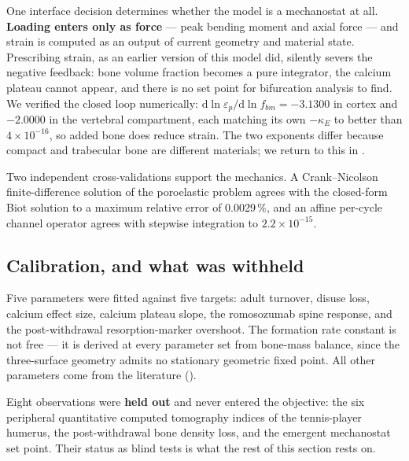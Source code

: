 \documentclass[10pt,letterpaper]{article}
\begin{document}
One interface decision determines whether the model is a mechanostat at all.
\textbf{Loading enters only as force} --- peak bending moment and axial force
--- and strain is computed as an output of current geometry and material
state. Prescribing strain, as an earlier version of this model did, silently
severs the negative feedback: bone volume fraction becomes a pure integrator,
the calcium plateau cannot appear, and there is no set point for bifurcation
analysis to find. We verified the closed loop numerically:
$\mathrm{d}\ln\varepsilon_p/\mathrm{d}\ln f_{bm} = -3.1300$ in cortex and
$-2.0000$ in the vertebral compartment, each matching its own $-\kappa_E$ to
better than $4\times10^{-16}$, so added bone does reduce strain. The two
exponents differ because compact and trabecular bone are different materials;
we return to this in .

Two independent cross-validations support the mechanics. A Crank--Nicolson
finite-difference solution of the poroelastic problem agrees with the
closed-form Biot solution to a maximum relative error of 0.0029\,\%, and an
affine per-cycle channel operator agrees with stepwise integration to
$2.2\times10^{-15}$.

\subsection*{Calibration, and what was withheld}

Five parameters were fitted against five targets: adult turnover, disuse loss,
calcium effect size, calcium plateau slope, the romosozumab spine response,
and the post-withdrawal resorption-marker overshoot. The formation rate
constant is not free --- it is derived at every parameter set from bone-mass
balance, since the three-surface geometry admits no stationary geometric fixed
point. All other parameters come from the literature ().

Eight observations were \textbf{held out} and never entered the objective: the
six peripheral quantitative computed tomography indices of the tennis-player
humerus, the post-withdrawal bone density loss, and the emergent mechanostat
set point. Their status as blind tests is what the rest of this section rests
on.
\end{document}
